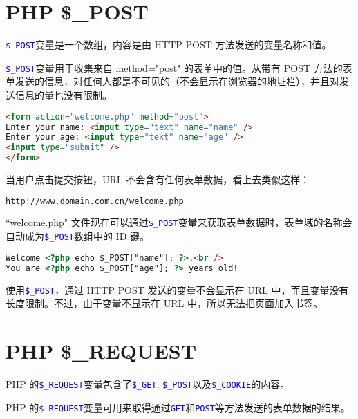 \chapter{PHP \$\_POST}

\textcolor{Blue}{\texttt{\$\_POST}}变量是一个数组，内容是由 HTTP POST 方法发送的变量名称和值。



\textcolor{Blue}{\texttt{\$\_POST}}变量用于收集来自 method="post" 的表单中的值。从带有 POST 方法的表单发送的信息，对任何人都是不可见的（不会显示在浏览器的地址栏），并且对发送信息的量也没有限制。

\begin{lstlisting}[language=HTML]
<form action="welcome.php" method="post">
Enter your name: <input type="text" name="name" />
Enter your age: <input type="text" name="age" />
<input type="submit" />
</form>
\end{lstlisting}

当用户点击提交按钮，URL 不会含有任何表单数据，看上去类似这样：


\begin{lstlisting}[language=bash]
http://www.domain.com.cn/welcome.php
\end{lstlisting}

``welcome.php" 文件现在可以通过\textcolor{Blue}{\texttt{\$\_POST}}变量来获取表单数据时，表单域的名称会自动成为\textcolor{Blue}{\texttt{\$\_POST}}数组中的 ID 键。

\begin{lstlisting}[language=HTML]
Welcome <?php echo $_POST["name"]; ?>.<br />
You are <?php echo $_POST["age"]; ?> years old!
\end{lstlisting}


使用\textcolor{Blue}{\texttt{\$\_POST}}，通过 HTTP POST 发送的变量不会显示在 URL 中，而且变量没有长度限制。不过，由于变量不显示在 URL 中，所以无法把页面加入书签。







\chapter{PHP \$\_REQUEST}


PHP 的\textcolor{Blue}{\texttt{\$\_REQUEST}}变量包含了\textcolor{Blue}{\texttt{\$\_GET}}, \textcolor{Blue}{\texttt{\$\_POST}}以及\textcolor{Blue}{\texttt{\$\_COOKIE}}的内容。

PHP 的\textcolor{Blue}{\texttt{\$\_REQUEST}}变量可用来取得通过\textcolor{Blue}{\texttt{GET}}和\textcolor{Blue}{\texttt{POST}}等方法发送的表单数据的结果。




